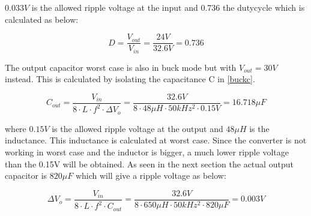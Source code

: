 $0.033V$ is the allowed ripple voltage at the input and 0.736 the dutycycle which is calculated as below:

\begin{equation} \label{buckduty}
D = \frac{V_{out}}{V_{in}} = \frac{24V}{32.6V} = 0.736
\end{equation} 


The output capacitor worst case is also in buck mode but with $V_{out}=30V$  instead. This is calculated by isolating the capacitance C in \ref{buckc}. 

\begin{equation} \label{buckc} 
C_{out} =\frac{V_{in}}{8\cdot L\cdot f^2\cdot \Delta V_o} = \frac{32.6V}{8\cdot 48\mu H\cdot 50kHz^2\cdot 0.15V} = 16.718\mu F
\end{equation}

where $0.15V$ is the allowed ripple voltage at the output and $48\mu H$ is the inductance. This inductance is calculated at worst case. 
Since the converter is not working in worst case and the inductor is bigger, a much lower ripple voltage than the 0.15V will be obtained. As seen in the next section the actual output capacitor is $820\mu F$ which will give a ripple voltage as below:

\begin{equation} \label{buckc} 
\Delta V_o = \frac{V_{in}}{8\cdot L\cdot f^2\cdot C_{out}} = \frac{32.6V}{8\cdot 650\mu H\cdot 50kHz^2\cdot 820\mu F} = 0.003V
\end{equation}
   